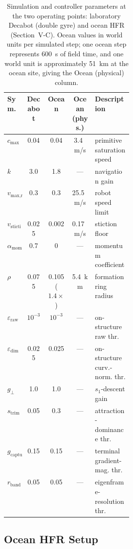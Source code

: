 \documentclass[lettersize,journal]{IEEEtran}
\begin{document}
\begin{table}[!t]
\centering
\caption{Simulation and controller parameters at the two operating
points: laboratory Decabot (double gyre) and ocean HFR
(Section~\mbox{V-C}). Ocean values in world units per
simulated step; one ocean step represents 600~s of field time, and one
world unit is approximately 51~km at the ocean site, giving the Ocean
(physical) column.}
\label{tab:params}
\scriptsize
\setlength{\tabcolsep}{2.5pt}
\begin{tabular}{@{}lccc>{\raggedright\arraybackslash}p{0.30\linewidth}@{}}
\hline
\textbf{Sym.} & \textbf{Decabot} & \textbf{Ocean} & \textbf{Ocean (phys.)} & \textbf{Description} \\
\hline
$c_{\max}$ & 0.04 & 0.04 & 3.4~m/s & primitive saturation speed \\
$k$ & 3.0 & 1.8 & --- & navigation gain \\
$v_{\text{max,robot}}$ & 0.3 & 0.3 & 25.5~m/s & robot speed limit \\
$v_{\text{stiction}}$ & 0.025 & 0.002 & 0.17~m/s & stiction floor \\
$\alpha_{\text{mom}}$ & 0.7 & 0 & --- & momentum coefficient \\
$\rho$ & 0.075 & 0.105 ($1.4\times$) & 5.4~km & formation ring radius \\
$\varepsilon_{\text{raw}}$ & $10^{-3}$ & $10^{-3}$ & --- & on-structure raw thr. \\
$\varepsilon_{\text{dim}}$ & 0.025 & 0.025 & --- & on-structure curv.-norm. thr. \\
$g_\perp$ & 1.0 & 1.0 & --- & $s_1$-descent gain \\
$s_{\text{trim}}$ & 0.05 & 0.3 & --- & attraction-dominance thr. \\
$g_{\text{capture}}$ & 0.15 & 0.15 & --- & terminal gradient-mag. thr. \\
$r_{\text{band}}$ & 0.05 & 0.05 & --- & eigenframe-resolution thr. \\
\hline
\end{tabular}
\end{table}

\subsection{Ocean HFR Setup}
\label{sec:ocean_sim}
\end{document}
